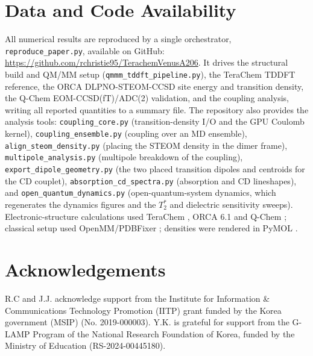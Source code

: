 \documentclass[journal=jpcbfk, manuscript=article, layout=twocolumn, doi=true]{achemso}
\begin{document}
\section{Data and Code Availability}

All numerical results are reproduced by a single orchestrator, \texttt{reproduce\_paper.py}, available on GitHub: \url{https://github.com/rchristie95/TerachemVenusA206}. It drives the structural build and QM/MM setup (\texttt{qmmm\_\allowbreak tddft\_\allowbreak pipeline.py}), the TeraChem TDDFT reference, the ORCA DLPNO-STEOM-CCSD site energy and transition density, the Q-Chem EOM-CCSD(fT)/ADC(2) validation, and the coupling analysis, writing all reported quantities to a summary file. The repository also provides the analysis tools: \texttt{coupling\_core.py} (transition-density I/O and the GPU Coulomb kernel), \texttt{coupling\_ensemble.py} (coupling over an MD ensemble), \texttt{align\_\allowbreak steom\_\allowbreak density.py} (placing the STEOM density in the dimer frame), \texttt{multipole\_analysis.py} (multipole breakdown of the coupling), \texttt{export\_\allowbreak dipole\_\allowbreak geometry.py} (the two placed transition dipoles and centroids for the CD couplet), \texttt{absorption\_\allowbreak cd\_\allowbreak spectra.py} (absorption and CD lineshapes), and \texttt{open\_\allowbreak quantum\_\allowbreak dynamics.py} (open-quantum-system dynamics, which regenerates the dynamics figures and the $T_2^*$ and dielectric sensitivity sweeps). Electronic-structure calculations used TeraChem \cite{terachem2009,seritan2021terachem}, ORCA 6.1 \cite{neese2020orca,neese2022orca} and Q-Chem \cite{epifanovsky2021qchem}; classical setup used OpenMM/PDBFixer \cite{openmm2017,pdbfixer}; densities were rendered in PyMOL \cite{delano2002pymol}.

\section{Acknowledgements}
R.C and J.J. acknowledge support from the Institute for Information \& Communications Technology Promotion (IITP) grant funded by the Korea government (MSIP) (No. 2019-000003). Y.K. is grateful for support from the G-LAMP Program of the National Research Foundation of Korea, funded by the Ministry of Education (RS-2024-00445180). 


\end{document}

